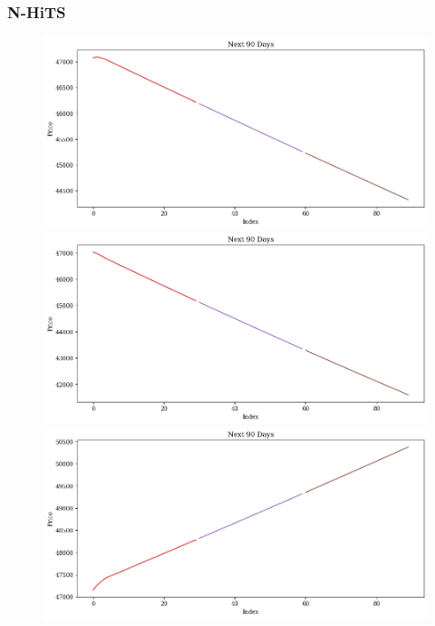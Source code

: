 \subsubsection{N-HiTS}
\begin{figure}[H]
    \centering
    \begin{minipage}{0.15\textwidth}
    \centering
    \includegraphics[width=1\textwidth]{resources/chapter-5/newdata1/predicted/BIDV_N-HiTS_7-3_90Days.png}
    \end{minipage}
    \hfill
    \begin{minipage}{0.15\textwidth}
    \centering
    \includegraphics[width=1\textwidth]{resources/chapter-5/newdata1/predicted/BIDV_N-HiTS_8-2_90Days.png}
    \end{minipage}
    \hfill
        \begin{minipage}{0.15\textwidth}
    \centering
    \includegraphics[width=1\textwidth]{resources/chapter-5/newdata1/predicted/BIDV_N-HiTS_9-1_90Days.png}

\end{minipage}
\end{figure}
